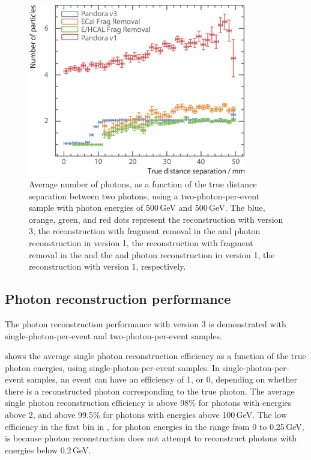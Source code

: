 \begin{figure}[tbph]
\centering
\includegraphics[width=0.85\textwidth]{photon/DoubleCompareAlg4}
\caption[Average number of photons, as a function of the MC distance separation for different algorithms combinations.]
{Average number of photons, as a function of the true distance separation between two photons, using a two-photon-per-event sample with photon energies of  500\,GeV and 500\,GeV. The blue, orange, green, and red dots represent the reconstruction with \pandora version 3, the reconstruction with fragment removal in the \ECAL and photon reconstruction in  \pandora version 1,  the reconstruction with fragment removal in the \ECAL and the \HCAL and photon reconstruction in  \pandora version 1, the reconstruction with \pandora version 1, respectively.}
\label{fig:photonDoubleCompareAlgs}
\end{figure}

\subsection{Photon reconstruction performance}

The photon reconstruction performance with \pandora version 3 is demonstrated with  single-photon-per-event and  two-photon-per-event samples.

 shows the average single photon reconstruction  efficiency as a function of the true photon energies, using single-photon-per-event samples.  In single-photon-per-event samples, an event can have an efficiency of 1, or 0, depending on whether there is a reconstructed photon  corresponding to the true photon. The average single photon reconstruction efficiency is above 98\% for photons with energies above 2\GeV, and above 99.5\% for photons  with energies  above 100\,GeV.  The low efficiency in the first bin in , for photon energies in the range from 0 to 0.25\,GeV, is because photon reconstruction does not attempt to reconstruct photons with energies below 0.2\,GeV.

